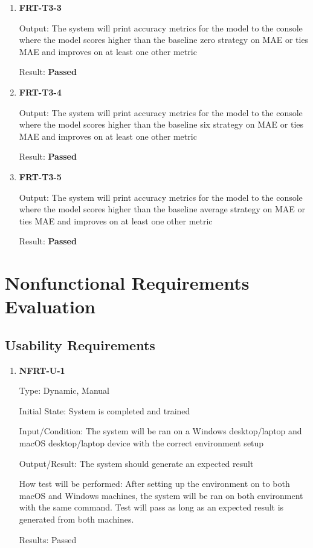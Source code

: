 \documentclass[12pt, titlepage]{article}
\begin{document}
\begin{enumerate}

\item \textbf{FRT-T3-3}

Output: The system will print accuracy metrics for the model to the console where the model scores higher than the baseline zero strategy on MAE or ties MAE and improves on at least one other metric

Result: \textbf{Passed}

\item \textbf{FRT-T3-4}

Output: The system will print accuracy metrics for the model to the console where the model scores higher than the baseline six strategy on MAE or ties MAE and improves on at least one other metric

Result: \textbf{Passed}

\item \textbf{FRT-T3-5}

Output: The system will print accuracy metrics for the model to the console where the model scores higher than the baseline average strategy on MAE or ties MAE and improves on at least one other metric

Result: \textbf{Passed}

 \end{enumerate}

\section{Nonfunctional Requirements Evaluation}

\subsection{Usability Requirements}

\begin{enumerate}

\item \textbf{NFRT-U-1}
    
Type: Dynamic, Manual
    					
Initial State: System is completed and trained
    					
Input/Condition: The system will be ran on a Windows desktop/laptop and macOS desktop/laptop device with the correct environment setup
    					
Output/Result: The system should generate an expected result 
    					
How test will be performed: After setting up the environment on to both macOS and Windows machines, the system will be ran on both environment with the same command. Test will pass as long as an expected result is generated from both machines.

Results: Passed
    
\end{enumerate}
		
\end{document}
